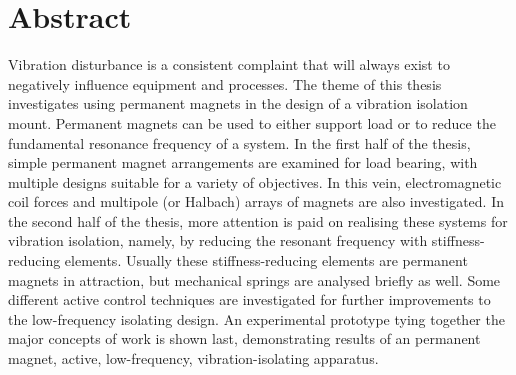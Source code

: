 
\chapter{Abstract}

Vibration disturbance is a consistent complaint that will always exist to
negatively influence equipment and processes. The theme of this thesis
investigates using permanent magnets in the design of a vibration isolation
mount. Permanent magnets can be used to either support load or to reduce the
fundamental resonance frequency of a system. In the first half of the thesis,
simple permanent magnet arrangements are examined for load bearing, with
multiple designs suitable for a variety of objectives. In this vein,
electromagnetic coil forces and multipole (or Halbach) arrays of magnets are
also investigated. In the second half of the thesis, more attention is paid on
realising these systems for vibration isolation, namely, by reducing the
resonant frequency with stiffness-reducing elements. Usually these
stiffness-reducing elements are permanent magnets in attraction, but
mechanical springs are analysed briefly as well. Some different active control
techniques are investigated for further improvements to the low-frequency
isolating design. An experimental prototype tying together the major concepts
of work is shown last, demonstrating results of an permanent magnet, active,
low-frequency, vibration-isolating apparatus.